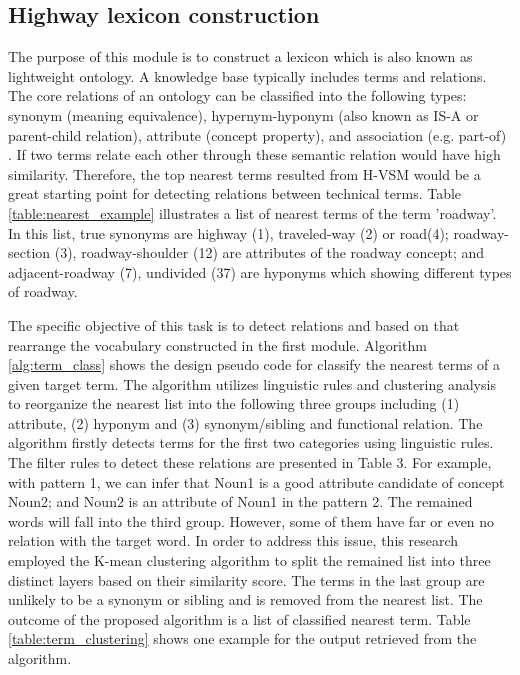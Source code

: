 \documentclass[Journal, InsideFigs, DoubleSpace]{ascelike} %
\begin{document}
\subsection{Highway lexicon construction}
The purpose of this module is to construct a lexicon which is also known as lightweight ontology. A knowledge base typically includes terms and relations. The core relations of an ontology can be classified into the following types: synonym (meaning equivalence), hypernym-hyponym (also known as IS-A or parent-child relation), attribute (concept property), and association (e.g. part-of) \cite{jiang97,lee13}. If two terms relate each other through these semantic relation would have high similarity. Therefore, the top nearest terms resulted from H-VSM would be a great starting point for detecting relations between technical terms. Table \ref{table:nearest_example} illustrates a list of nearest terms of the term 'roadway'. In this list, true synonyms are highway (1), traveled-way (2) or road(4); roadway-section (3), roadway-shoulder (12) are attributes of the roadway concept; and adjacent-roadway (7), undivided (37) are hyponyms which showing different types of roadway.
\par
The specific objective of this task is to detect relations and based on that rearrange the vocabulary constructed in the first module. Algorithm \ref{alg:term_class} shows the design pseudo code for classify the nearest terms of a given target term. The algorithm utilizes linguistic rules and clustering analysis to reorganize the nearest list into the following three groups including (1) attribute, (2) hyponym and (3) synonym/sibling and functional relation. The algorithm firstly detects terms for the first two categories using linguistic rules. The filter rules to detect these relations are presented in Table 3. For example, with pattern 1, we can infer that Noun1 is a good attribute candidate of concept Noun2; and Noun2 is an attribute of Noun1 in the pattern 2. The remained words will fall into the third group. However, some of them have far or even no relation with the target word. In order to address this issue, this research employed the K-mean clustering algorithm \cite{macqueen67} to split the remained list into three distinct layers based on their similarity score. The terms in the last group are unlikely to be a synonym or sibling and is removed from the nearest list. The outcome of the proposed algorithm is a list of classified nearest term. Table \ref{table:term_clustering} shows one example for the output retrieved from the algorithm. 
\end{document}
